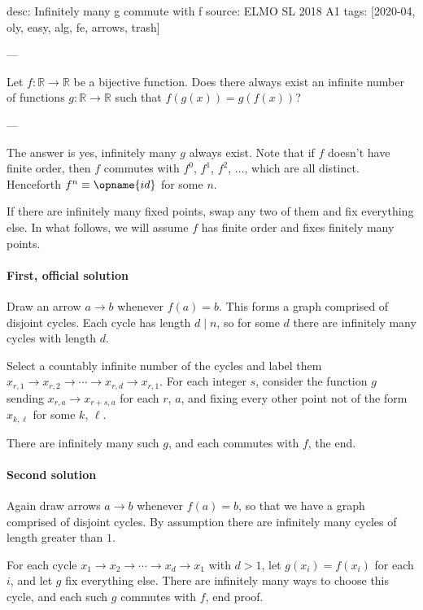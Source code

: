 desc: Infinitely many g commute with f
source: ELMO SL 2018 A1
tags: [2020-04, oly, easy, alg, fe, arrows, trash]

---

Let $f:\mathbb R\to\mathbb R$ be a bijective function. Does there always exist an infinite number of functions $g:\mathbb R\to\mathbb R$ such that $f(g(x))=g(f(x))$?

---

The answer is yes, infinitely many $g$ always exist. Note that if $f$ doesn't have finite order, then $f$ commutes with $f^0$, $f^1$, $f^2$, $\ldots$, which are all distinct. Henceforth $f^n\equiv\opname{id}$ for some $n$.

If there are infinitely many fixed points, swap any two of them and fix everything else. In what follows, we will assume $f$ has finite order and fixes finitely many points.

\paragraph{First, official solution} Draw an arrow $a\to b$ whenever $f(a)=b$. This forms a graph comprised of disjoint cycles. Each cycle has length $d\mid n$, so for some $d$ there are infinitely many cycles with length $d$.

Select a countably infinite number of the cycles and label them $x_{r,1}\to x_{r,2}\to\cdots\to x_{r,d}\to x_{r,1}$. For each integer $s$, consider the function $g$ sending $x_{r,a}\to x_{r+s,a}$ for each $r$, $a$, and fixing every other point not of the form $x_{k,\ell}$ for some $k$, $\ell$.

There are infinitely many such $g$, and each commutes with $f$, the end.

\paragraph{Second solution} Again draw arrows $a\to b$ whenever $f(a)=b$, so that we have a graph comprised of disjoint cycles. By assumption there are infinitely many cycles of length greater than $1$.

For each cycle $x_1\to x_2\to\cdots\to x_d\to x_1$ with $d>1$, let $g(x_i)=f(x_i)$ for each $i$, and let $g$ fix everything else. There are infinitely many ways to choose this cycle, and each such $g$ commutes with $f$, end proof.
